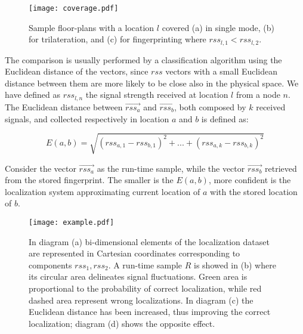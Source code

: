 \begin{figure}[h!tb]
\centering\texttt{[image: coverage.pdf]}
\caption[Example of indoor location covered in single, trilateration and fingerprinting mode.]{Sample floor-plans with a location $l$ covered (a) in single mode, (b) for trilateration, and (c) for fingerprinting where $rss_{l,1} < rss_{l,2}$.}
\label{fig:coverage}
\end{figure}

The comparison is usually performed by a classification algorithm using the Euclidean distance of the vectors, since $rss$ vectors with a small Euclidean distance between them are more likely to be close also in the physical space. We have defined as \(rss_{l,n}\) the signal strength received at location \(l\) from a node $n$. The Euclidean distance between $\vec{rss_a}$ and $\vec{rss_b}$, both composed by \(k\) received signals, and collected respectively in location \(a\) and \(b\) is defined as:

\begin{equation}\label{eq:E}
E(a,b)=\sqrt{(rss_{a,1} - rss_{b,1})^2 + ... + (rss_{a,k} - rss_{b,k})^2}
\end{equation}

Consider the vector $\vec{rss_a}$ as the run-time sample, while the vector $\vec{rss_b}$ retrieved from the stored fingerprint. The smaller is the \(E(a,b)\), more confident is the localization system approximating current location of \(a\) with the stored location of \(b\).

\begin{figure}
\centering\texttt{[image: example.pdf]}
\caption[Relation between localization accuracy and RSS samples Euclidean distance.]{In diagram (a) bi-dimensional elements of the localization dataset are represented in Cartesian coordinates corresponding to components $rss_1, rss_2$. A run-time sample $R$ is showed in (b) where its circular area delineates signal fluctuations. Green area is proportional to the probability of correct localization, while red dashed area represent wrong localizations. In diagram (c) the Euclidean distance has been increased, thus improving the correct localization; diagram (d) shows the opposite effect.}
\label{fig:fing_example}
\end{figure}

